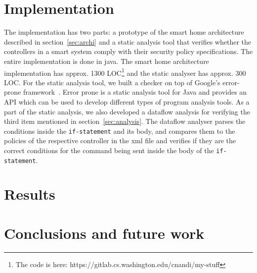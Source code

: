 \documentclass{article}
\begin{document}
\section{Implementation}
The implementation has two parts: a prototype of the smart home architecture described in section~\ref{sec:archi} and a static analysis tool that verifies whether the controllers in a smart system comply with their security policy specifications. The entire implementation is done in java. The smart home architecture implementation has approx. 1300 LOC\footnote{The code is here: https://gitlab.cs.washington.edu/cnandi/my-stuff} and the static analyser has approx. 300 LOC.  
For the static analysis tool, we built a checker on top of Google's error-prone framework~\cite{errorprone}. Error prone is a static analysis tool for Java and provides an API which can be used to develop different types of program analysis tools. As a part of the static analysis, we also developed a dataflow analysis for verifying the third item mentioned in section~\ref{sec:analysis}. The dataflow analyser parses the conditions inside the \texttt{if-statement} and its body, and compares them to the policies of the respective controller in the xml file and verifies if they are the correct conditions for the command being sent inside the body of the \texttt{if-statement}. 

\section{Results}

\section{Conclusions and future work}


\end{document}
